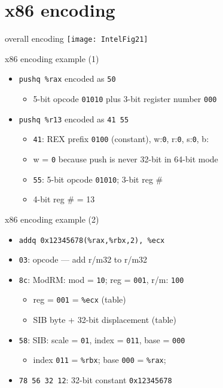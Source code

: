\section{x86 encoding}

\begin{frame}{overall encoding}
\texttt{[image: IntelFig21]}
\end{frame}

\begin{frame}[fragile,label=x86ex1]{x86 encoding example (1)}
    \begin{itemize}
    \item \lstinline|pushq %rax| encoded as {\tt 50}
        \begin{itemize}
        \item 5-bit opcode {\tt 01010} plus 3-bit register number {\tt 000}
        \end{itemize}
    \item \lstinline|pushq %r13| encoded as {\tt 41 55}
        \begin{itemize}
        \item {\tt 41}: REX prefix {\tt 0100} (constant), w:{\tt 0}, r:{\tt 0}, s:{\tt 0}, b:{\tt \color{blue!80!black}{1}}
        \item w = {\tt 0} because push is never 32-bit in 64-bit mode
        \item {\tt 55}: 5-bit opcode {\tt 01010}; 3-bit reg \# {\tt \color{green!80!black}{101}}
        \item 4-bit reg \# {\tt \color{blue!80!black}{1}\color{green!80!black}{101}} = 13
        \end{itemize}
    \end{itemize}
\end{frame}

\begin{frame}[fragile,label=x86ex2]{x86 encoding example (2)}
    \begin{itemize}
    \item \lstinline|addq 0x12345678(%rax,%rbx,2), %ecx|
    \item {\tt 03}: opcode --- add r/m32 to r/m32
    \item {\tt 8c}: ModRM: mod = {\tt 10}; reg = {\tt 001}, r/m: {\tt 100}
        \begin{itemize}
        \item reg = {\tt 001} = {\tt \%ecx} (table)
        \item SIB byte + 32-bit displacement (table)
        \end{itemize}
    \item {\tt 58}: SIB: scale = {\tt 01}, index = {\tt 011}, base = {\tt 000}
        \begin{itemize}
        \item index {\tt 011} = {\tt \%rbx}; base {\tt 000} = {\tt \%rax};
        \end{itemize}
    \item {\tt 78 56 32 12}: 32-bit constant {\tt 0x12345678}
    \end{itemize}
\end{frame}


